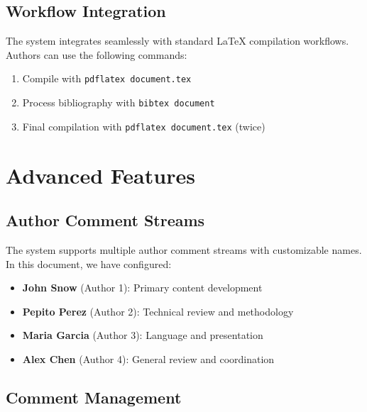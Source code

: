 \documentclass[review]{elsarticle}
\begin{document}

\subsection{Workflow Integration}

The system integrates seamlessly with standard LaTeX compilation workflows. Authors can use the following commands:


\begin{enumerate}
\item Compile with \texttt{pdflatex document.tex}
\item Process bibliography with \texttt{bibtex document}
\item Final compilation with \texttt{pdflatex document.tex} (twice)
\end{enumerate}


\section{Advanced Features}

\subsection{Author Comment Streams}

The system supports multiple author comment streams with customizable names. In this document, we have configured:

\begin{itemize}
\item \textbf{John Snow} (Author 1): Primary content development
\item \textbf{Pepito Perez} (Author 2): Technical review and methodology  
\item \textbf{Maria Garcia} (Author 3): Language and presentation
\item \textbf{Alex Chen} (Author 4): General review and coordination
\end{itemize}


\subsection{Comment Management}
\end{document}
